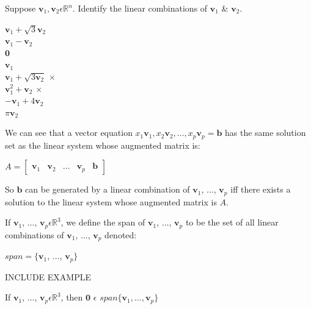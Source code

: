 \documentclass{report}
\begin{document}
\begin{example}
	Suppose $\mathbf{v}_1, \mathbf{v}_2 \epsilon \mathbb{R}^n$. Identify the linear combinations of $\mathbf{v}_1$ \& $\mathbf{v}_2$.
	\begin{center}
		$\mathbf{v}_1+\sqrt{3}\mathbf{v}_2$  \checkmark\\
		$\mathbf{v}_1-\mathbf{v}_2$  \checkmark\\
		$\mathbf{0}$  \checkmark\\
		$\mathbf{v}_1$  \checkmark\\
		$\mathbf{v}_1+\sqrt{3\mathbf{v}_2}$  $\times$\\
		$\mathbf{v}_1^2+\mathbf{v}_2$  $\times$\\
		$-\mathbf{v}_1+4\mathbf{v}_2$  \checkmark\\
		$\pi\mathbf{v}_2$  \checkmark\\
	\end{center}
\end{example}
\begin{example}
	
\end{example}
We can see that a vector equation $x_1\mathbf{v}_1,x_2\mathbf{v}_2, \ldots ,x_p\mathbf{v}_p = \mathbf{b}$ has the same solution set as the linear system whose augmented matrix is:
\begin{center}
	 $A = \begin{bmatrix} \mathbf{v}_1 & \mathbf{v}_2 & \ldots & \mathbf{v}_p & \mathbf{b} \end{bmatrix}$
\end{center}
So $\mathbf{b}$ can be generated by a linear combination of $\mathbf{v}_1$, $\ldots$, $\mathbf{v}_p$ iff there exists a solution to the linear system whose augmented matrix is $A$.
\begin{definition}
	If $\mathbf{v}_1$, $\ldots$, $\mathbf{v}_p \epsilon \mathbb{R}^3$, we define the span of $\mathbf{v}_1$, $\ldots$, $\mathbf{v}_p$ to be the set of all linear combinations of $\mathbf{v}_1$, $\ldots$, $\mathbf{v}_p$ denoted:
	\begin{center}
		$span=\{ \mathbf{v}_1$, $\ldots$, $\mathbf{v}_p\}$
	\end{center}
\end{definition}
\begin{center}
	INCLUDE EXAMPLE
\end{center}
\begin{theorem}
	If $\mathbf{v}_1$, $\ldots$, $\mathbf{v}_p \epsilon \mathbb{R}^3$, then $\mathbf{0}$ $\epsilon$ $span\{ \mathbf{v}_1, \ldots, \mathbf{v}_p\}$
\end{theorem}
\end{document}
